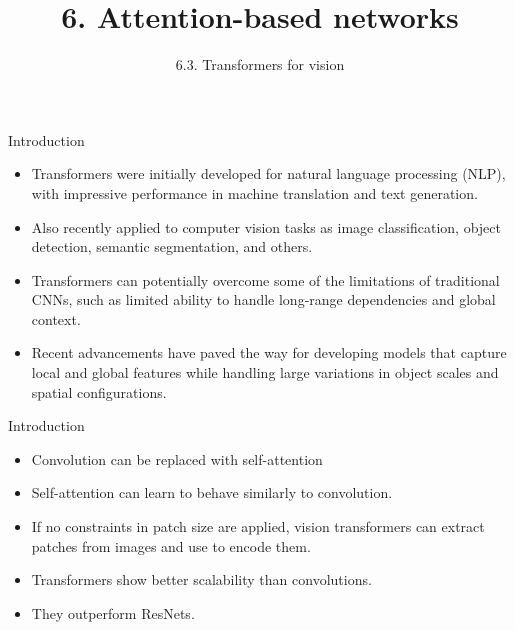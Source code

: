 \documentclass{beamer}
\title{6. Attention-based networks}
\subtitle{6.3. Transformers for vision}
\begin{document}
\maketitle


\begin{frame}{Introduction}
\begin{itemize}

\item Transformers were initially developed for natural language processing (NLP), with impressive performance in machine translation and text generation.

\item Also recently applied to computer vision tasks as image classification, object detection, semantic segmentation, and others.

\item Transformers can potentially overcome some of the limitations of traditional CNNs, such as limited ability to handle long-range dependencies and global context.

\item Recent advancements have paved the way for developing models that capture local and global features while handling large variations in object scales and spatial configurations.


\end{itemize}
\end{frame}

\begin{frame}{Introduction}

    \begin{itemize}
        \item Convolution can be replaced with self-attention
        \item Self-attention can learn to behave similarly to convolution.
        \item If no constraints in patch size are applied, vision transformers can extract patches from images and use to encode them. 
        \item Transformers show better scalability than convolutions. 
        \item They outperform ResNets. 
    \end{itemize}
\end{frame}
\end{document}
